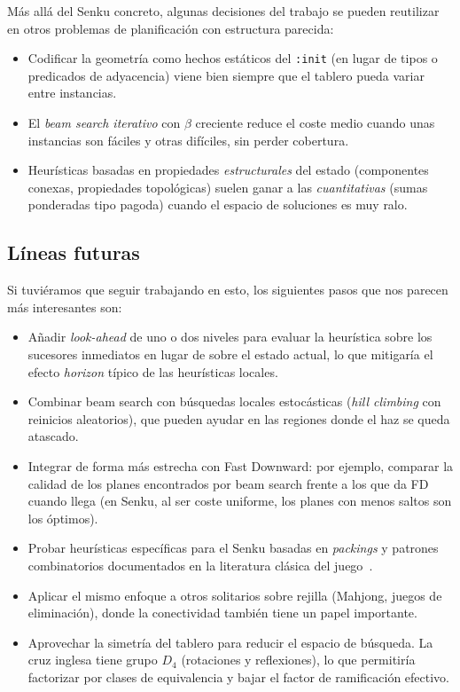 \documentclass[conference,a4paper]{IEEEtran}
\begin{document}
Más allá del Senku concreto, algunas decisiones del trabajo se pueden
reutilizar en otros problemas de planificación con estructura
parecida:

\begin{itemize}
\item Codificar la geometría como hechos estáticos del \texttt{:init}
  (en lugar de tipos o predicados de adyacencia) viene bien siempre que
  el tablero pueda variar entre instancias.
\item El \emph{beam search iterativo} con $\beta$ creciente reduce el
  coste medio cuando unas instancias son fáciles y otras difíciles, sin
  perder cobertura.
\item Heurísticas basadas en propiedades \emph{estructurales} del
  estado (componentes conexas, propiedades topológicas) suelen ganar a
  las \emph{cuantitativas} (sumas ponderadas tipo pagoda) cuando el
  espacio de soluciones es muy ralo.
\end{itemize}

\subsection{Líneas futuras}

Si tuviéramos que seguir trabajando en esto, los siguientes pasos que
nos parecen más interesantes son:

\begin{itemize}
\item Añadir \emph{look-ahead} de uno o dos niveles para evaluar la
  heurística sobre los sucesores inmediatos en lugar de sobre el estado
  actual, lo que mitigaría el efecto \emph{horizon} típico de las
  heurísticas locales.
\item Combinar beam search con búsquedas locales estocásticas
  (\emph{hill climbing} con reinicios aleatorios), que pueden ayudar
  en las regiones donde el haz se queda atascado.
\item Integrar de forma más estrecha con Fast Downward: por ejemplo,
  comparar la calidad de los planes encontrados por beam search frente
  a los que da FD cuando llega (en Senku, al ser coste uniforme, los
  planes con menos saltos son los óptimos).
\item Probar heurísticas específicas para el Senku basadas en
  \emph{packings} y patrones combinatorios documentados en la
  literatura clásica del juego~\cite{senku-counts}.
\item Aplicar el mismo enfoque a otros solitarios sobre rejilla
  (Mahjong, juegos de eliminación), donde la conectividad también
  tiene un papel importante.
\item Aprovechar la simetría del tablero para reducir el espacio de
  búsqueda. La cruz inglesa tiene grupo $D_4$ (rotaciones y
  reflexiones), lo que permitiría factorizar por clases de
  equivalencia y bajar el factor de ramificación efectivo.
\end{itemize}
\end{document}
